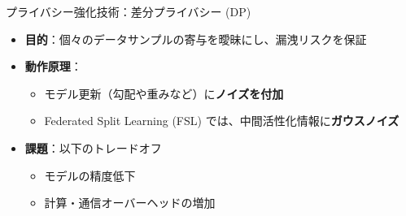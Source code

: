 \documentclass[unicode,12pt,aspectratio=169,dvipdfmx]{beamer}
\begin{document}

\begin{frame}{プライバシー強化技術：差分プライバシー (DP)}
\begin{itemize}
    \item \textbf{目的}：個々のデータサンプルの寄与を曖昧にし、漏洩リスクを保証
    \item \textbf{動作原理}：
    \begin{itemize}
        \item モデル更新（勾配や重みなど）に\textbf{ノイズを付加}
        \item Federated Split Learning (FSL) では、中間活性化情報に\textbf{ガウスノイズ}
    \end{itemize}
    \item \textbf{課題}：以下のトレードオフ
    \begin{itemize}
        \item モデルの精度低下
        \item 計算・通信オーバーヘッドの増加
    \end{itemize}
\end{itemize}
\end{frame}
\end{document}
